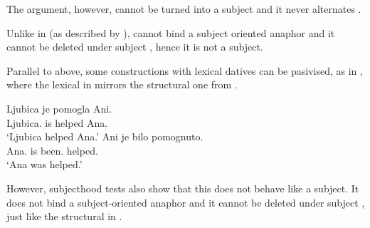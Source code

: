 \documentclass[output=paper,modfonts,newtxmath,hidelinks]{langscibook}
\begin{document}
\noindent The  argument, however, cannot be turned into a subject and it never alternates .

\ea\label{16:ex18}
\z \z

\noindent Unlike in  (as described by \citealt{zaenenetal85}),  cannot bind a subject oriented anaphor  and it cannot be deleted under subject  , hence it is not a subject.

\ea\label{16:dativesubjectpassive2}
\label{16:ex19a}
\label{16:ex19b}
\z \z

\noindent Parallel to  above, some constructions with lexical datives can be pasivised, as in , where the lexical  in  mirrors the structural one from .

\ea\label{16:lexicaldativepassive}
\ea \gll Ljubica je pomogla Ani.\\
Ljubica.\nomm{} is helped Ana.\datt\\
\glt `Ljubica helped Ana.'
\ex \gll Ani je bilo pomognuto.\\
Ana.\datt{} is been.\nsg{} helped.\nsg\\
\glt `Ana was helped.'\label{16:ex20b}
\z \z

\noindent However, \citet{zaenenetal85} subjecthood tests also show that this  does not behave like a subject. It does not bind a subject-oriented anaphor  and it cannot be deleted under subject  , just like the structural  in .\largerpage[2]
\end{document}
